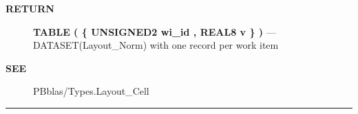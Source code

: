 \par
\begin{description}
\item [\colorbox{tagtype}{\color{white} \textbf{\textsf{RETURN}}}] \textbf{TABLE ( \{ UNSIGNED2 wi\_id , REAL8 v \} )} --- DATASET(Layout\_Norm) with one record per work item
\end{description}







\par
\begin{description}
\item [\colorbox{tagtype}{\color{white} \textbf{\textsf{SEE}}}] PBblas/Types.Layout\_Cell
\end{description}



\rule{\linewidth}{0.5pt}

